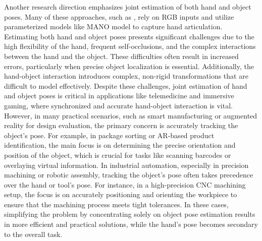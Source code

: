 Another research direction emphasizes joint estimation of both hand and object poses. Many of these approaches, such as \DIFdelbegin {}\DIFdelend \DIFaddbegin {}\DIFaddend , rely on RGB inputs and utilize parameterized models like MANO \cite{romero2022embodied} model to capture hand articulation. Estimating both hand and object poses presents significant challenges due to the high flexibility of the hand, frequent self-occlusions, and the complex interactions between the hand and the object. These difficulties often result in increased errors, particularly when precise object localization is essential. Additionally, the hand-object interaction introduces complex, non-rigid transformations that are difficult to model effectively. Despite these challenges, joint estimation of hand and object poses is critical in applications like telemedicine and immersive gaming, where synchronized and accurate hand-object interaction is vital. However, in many practical scenarios, such as smart manufacturing \DIFdelbegin {}\DIFdelend or augmented reality for design evaluation\DIFdelbegin {}\DIFdelend , the primary concern is accurately tracking the object's pose. For example, in package sorting or AR-based product identification, the main focus is on determining the precise orientation and position of the object, which is crucial for tasks like scanning barcodes or overlaying virtual information. In industrial automation, especially in precision machining or robotic assembly, tracking the object's pose often takes precedence over the hand or tool's pose. For instance, in a high-precision CNC machining setup, the focus is on accurately positioning and orienting the workpiece to ensure that the machining process meets tight tolerances. In these cases, simplifying the problem by concentrating solely on object pose estimation results in more efficient and practical solutions, while the hand's pose becomes secondary to the overall task.

